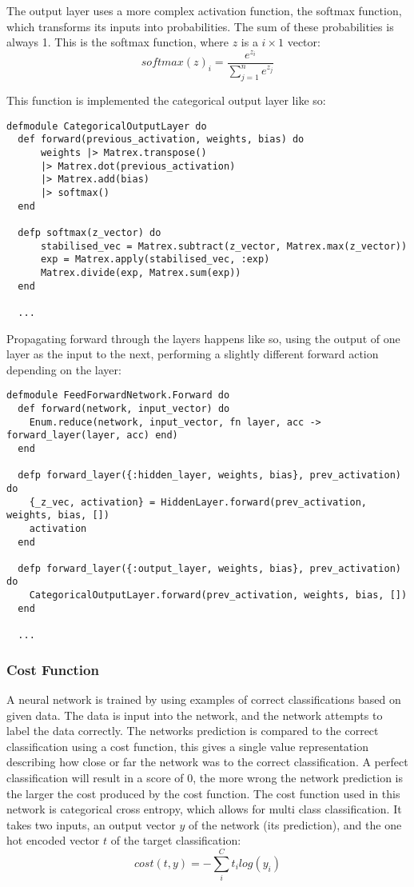 The output layer uses a more complex activation function, the softmax function,
which transforms its inputs into probabilities. The sum of these probabilities
is always 1. This is the softmax function, where \(z\) is a \(i \times 1\)
vector:
\begin{equation}
    softmax(z)_{i} = \frac{e^{z_{i}}}{\sum_{j=1}^{n} e^{z_{j}}}
\end{equation}

This function is implemented the categorical output layer like so:
\begin{lstlisting}
defmodule CategoricalOutputLayer do
  def forward(previous_activation, weights, bias) do
      weights |> Matrex.transpose()
      |> Matrex.dot(previous_activation)
      |> Matrex.add(bias)
      |> softmax()
  end

  defp softmax(z_vector) do
      stabilised_vec = Matrex.subtract(z_vector, Matrex.max(z_vector))
      exp = Matrex.apply(stabilised_vec, :exp)
      Matrex.divide(exp, Matrex.sum(exp))
  end

  ...
\end{lstlisting}

Propagating forward through the layers happens like so, using the output of one
layer as the input to the next, performing a slightly different forward action
depending on the layer:
\begin{lstlisting}
defmodule FeedForwardNetwork.Forward do
  def forward(network, input_vector) do
    Enum.reduce(network, input_vector, fn layer, acc -> forward_layer(layer, acc) end)
  end

  defp forward_layer({:hidden_layer, weights, bias}, prev_activation) do
    {_z_vec, activation} = HiddenLayer.forward(prev_activation, weights, bias, [])
    activation
  end

  defp forward_layer({:output_layer, weights, bias}, prev_activation) do
    CategoricalOutputLayer.forward(prev_activation, weights, bias, [])
  end

  ...
\end{lstlisting}

\subsubsection{Cost Function}
A neural network is trained by using examples of correct classifications based
on given data. The data is input into the network, and the network attempts to
label the data correctly. The networks prediction is compared to the correct
classification using a cost function, this gives a single value representation
describing how close or far the network was to the correct classification. A
perfect classification will result in a score of 0, the more wrong the network
prediction is the larger the cost produced by the cost function. The cost 
function used in this network is categorical cross entropy, which allows for
multi class classification. It takes two inputs, an output vector \(y\) of the network
(its prediction), and the one hot encoded vector \(t\) of the target classification:
\begin{equation}
    cost(t, y) = - \sum_{i}^{C} t_{i}log(y_{i})
\end{equation}

